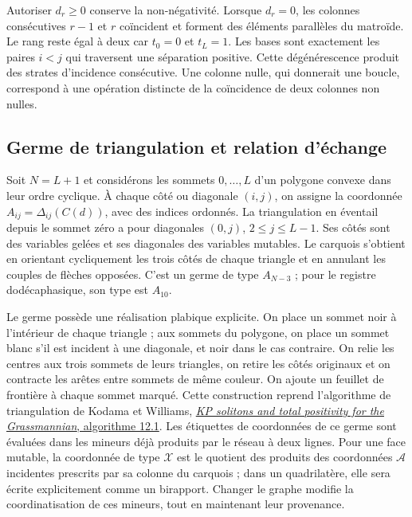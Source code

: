 Autoriser \(d_r\ge0\) conserve la non-négativité. Lorsque \(d_r=0\), les colonnes consécutives \(r-1\) et \(r\) coïncident et forment des éléments parallèles du matroïde. Le rang reste égal à deux car \(t_0=0\) et \(t_L=1\). Les bases sont exactement les paires \(i<j\) qui traversent une séparation positive. Cette dégénérescence produit des strates d'incidence consécutive. Une colonne nulle, qui donnerait une boucle, correspond à une opération distincte de la coïncidence de deux colonnes non nulles.

\subsection{Germe de triangulation et relation d’échange}

Soit \(N=L+1\) et considérons les sommets \(0,\ldots,L\) d’un polygone
convexe dans leur ordre cyclique. À chaque côté ou diagonale \((i,j)\), on assigne
la coordonnée \(A_{ij}=\Delta_{ij}(C(d))\), avec des indices ordonnés.
La triangulation en éventail depuis le sommet zéro a pour diagonales
\((0,j)\), \(2\le j\le L-1\). Ses côtés sont des variables gelées et
ses diagonales des variables mutables. Le carquois s’obtient en orientant
cycliquement les trois côtés de chaque triangle et en annulant les couples de
flèches opposées. C’est un germe de type \(A_{N-3}\) ; pour le registre
dodécaphasique, son type est \(A_{10}\).

Le germe possède une réalisation plabique explicite. On place un sommet
noir à l’intérieur de chaque triangle ; aux sommets du polygone, on place un
sommet blanc s’il est incident à une diagonale, et noir dans le cas contraire.
On relie les centres aux trois sommets de leurs triangles, on retire les
côtés originaux et on contracte les arêtes entre sommets de même couleur.
On ajoute un feuillet de frontière à chaque sommet marqué. Cette construction
reprend l’algorithme de triangulation de Kodama et Williams,
\href{https://people.math.harvard.edu/~williams/papers/KW-ArxivVersion.pdf}
{\emph{KP solitons and total positivity for the Grassmannian}, algorithme 12.1}.
Les étiquettes de coordonnées de ce germe sont évaluées dans les mineurs déjà produits par le réseau à deux lignes. Pour une face mutable, la coordonnée de type \(\mathcal X\) est le quotient des produits des coordonnées \(\mathcal A\) incidentes prescrits par sa colonne du carquois ; dans un quadrilatère, elle sera écrite explicitement comme un birapport. Changer le graphe modifie la coordinatisation de ces mineurs, tout en maintenant leur provenance.

